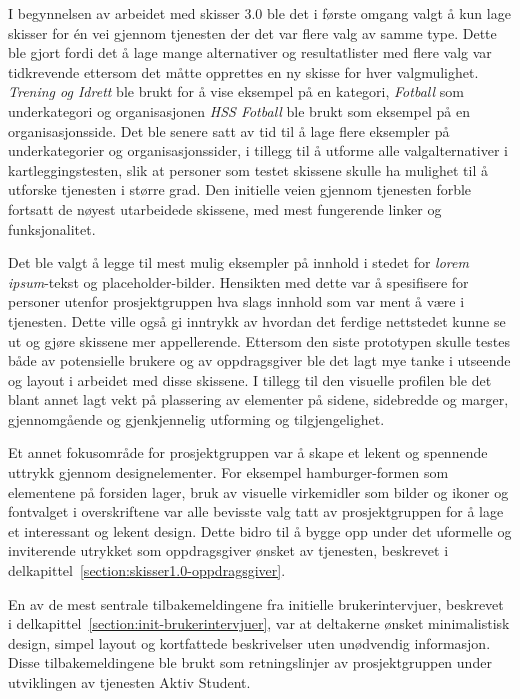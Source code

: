 I begynnelsen av arbeidet med skisser 3.0 ble det i første omgang valgt å kun lage skisser for én vei gjennom tjenesten der det var flere valg av samme type. Dette ble gjort fordi det å lage mange alternativer og resultatlister med flere valg var tidkrevende ettersom det måtte opprettes en ny skisse for hver valgmulighet. {\em  Trening og Idrett} ble brukt for å vise eksempel på en kategori, {\em  Fotball} som underkategori og organisasjonen {\em  HSS Fotball} ble brukt som eksempel på en organisasjonsside. Det ble senere satt av tid til å lage flere eksempler på underkategorier og organisasjonssider, i tillegg til å utforme alle valgalternativer i kartleggingstesten, slik at personer som testet skissene skulle ha mulighet til å utforske tjenesten i større grad. Den initielle veien gjennom tjenesten forble fortsatt de nøyest utarbeidede skissene, med mest fungerende linker og funksjonalitet.

Det ble valgt å legge til mest mulig eksempler på innhold i stedet for {\em  lorem ipsum}-tekst og placeholder-bilder. Hensikten med dette var å spesifisere for personer utenfor prosjektgruppen hva slags innhold som var ment å være i tjenesten. Dette ville også gi inntrykk av hvordan det ferdige nettstedet kunne se ut og gjøre skissene mer appellerende. Ettersom den siste prototypen skulle testes både av potensielle brukere og av oppdragsgiver ble det lagt mye tanke i utseende og layout i arbeidet med disse skissene. I tillegg til den visuelle profilen ble det blant annet lagt vekt på plassering av elementer på sidene, sidebredde og marger, gjennomgående og gjenkjennelig utforming og tilgjengelighet. 

Et annet fokusområde for prosjektgruppen var å skape et lekent og spennende uttrykk gjennom designelementer. For eksempel hamburger-formen som elementene på forsiden lager, bruk av visuelle virkemidler som bilder og ikoner og fontvalget i overskriftene var alle bevisste valg tatt av prosjektgruppen for å lage et interessant og lekent design. Dette bidro til å bygge opp under det uformelle og inviterende utrykket som oppdragsgiver ønsket av tjenesten, beskrevet i delkapittel~\ref{section:skisser1.0-oppdragsgiver}.

En av de mest sentrale tilbakemeldingene fra initielle brukerintervjuer, beskrevet i delkapittel~\ref{section:init-brukerintervjuer}, var at deltakerne ønsket minimalistisk design, simpel layout og kortfattede beskrivelser uten unødvendig informasjon. Disse tilbakemeldingene ble brukt som retningslinjer av prosjektgruppen under utviklingen av tjenesten Aktiv Student. 

